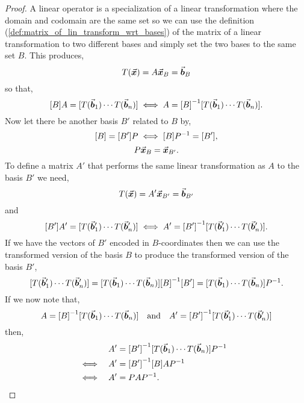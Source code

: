 \documentclass[../MathsNotesBase.tex]{subfiles}
\begin{document}
{	
		\bigskip
		\begin{proof}
			A linear operator is a specialization of a linear transformation where the domain and codomain are the same set so we can use the definition (\ref{def:matrix_of_lin_transform_wrt_bases}) of the matrix of a linear transformation \wrt to two different bases and simply set the two bases to the same set $B$. This produces,
			\[ T(\vec{\bm{x}}) = A\vec{\bm{x}}_B = \vec{\bm{b}}_B \]
			so that,
			\[ [B]A = [T(\vec{\bm{b}}_1) \cdots T(\vec{\bm{b}}_n)] \iff A = {[B]}^{-1}[T(\vec{\bm{b}}_1) \cdots T(\vec{\bm{b}}_n)]. \]		
			Now let there be another basis $B'$ related to $B$ by,
			\[ [B] = [B']P \iff [B]{P}^{-1} = [B'], \]
			\[ P\vec{\bm{x}}_B = \vec{\bm{x}}_{B'}. \]
			To define a matrix $A'$ that performs the same linear transformation as $A$ \wrt to the basis $B'$ we need,
			\[ T(\vec{\bm{x}}) = A'\vec{\bm{x}}_{B'} = \vec{\bm{b}}_{B'} \]
			and
			\[ [B']A' = [T(\vec{\bm{b}}_1') \cdots T(\vec{\bm{b}}_n')] \iff A' = {[B']}^{-1}[T(\vec{\bm{b}}_1') \cdots T(\vec{\bm{b}}_n')]. \]
			If we have the vectors of $B'$ encoded in $B$-coordinates then we can use the transformed version of the basis $B$ to produce the transformed version of the basis $B'$,
			\[ [T(\vec{\bm{b}}_1') \cdots T(\vec{\bm{b}}_n')] = [T(\vec{\bm{b}}_1) \cdots T(\vec{\bm{b}}_n)]{[B]}^{-1}[B'] = [T(\vec{\bm{b}}_1) \cdots T(\vec{\bm{b}}_n)]{P}^{-1}. \]
			If we now note that,
			\[ A = {[B]}^{-1}[T(\vec{\bm{b}}_1) \cdots T(\vec{\bm{b}}_n)] \hspace{10pt}\text{and}\hspace{10pt} A' = {[B']}^{-1}[T(\vec{\bm{b}}_1') \cdots T(\vec{\bm{b}}_n')]  \]
			then,
			\begin{align*}
				&& A' &= {[B']}^{-1}[T(\vec{\bm{b}}_1) \cdots T(\vec{\bm{b}}_n)]{P}^{-1} \\
				&\iff & A' &= {[B']}^{-1}[B]A{P}^{-1} &\text{\scriptsize{}} \\
				&\iff & A' &= PA{P}^{-1}. &\text{\scriptsize{}} \qedhere
			\end{align*}
		\end{proof}
		
}
\end{document}
